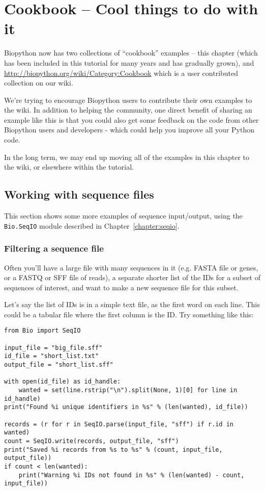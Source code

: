 \chapter{Cookbook -- Cool things to do with it}
\label{chapter:cookbook}

Biopython now has two collections of ``cookbook'' examples -- this chapter
(which has been included in this tutorial for many years and has gradually
grown), and \url{http://biopython.org/wiki/Category:Cookbook} which is a
user contributed collection on our wiki.

We're trying to encourage Biopython users to contribute their own examples
to the wiki. In addition to helping the community, one direct benefit of
sharing an example like this is that you could also get some feedback on
the code from other Biopython users and developers - which could help you
improve all your Python code.

In the long term, we may end up moving all of the examples in this chapter
to the wiki, or elsewhere within the tutorial.

\section{Working with sequence files}
\label{sec:cookbook-sequences}

This section shows some more examples of sequence input/output, using the
\verb|Bio.SeqIO| module described in Chapter~\ref{chapter:seqio}.

\subsection{Filtering a sequence file}

Often you'll have a large file with many sequences in it (e.g. FASTA file
or genes, or a FASTQ or SFF file of reads), a separate shorter list of
the IDs for a subset of sequences of interest, and want to make a new
sequence file for this subset.

Let's say the list of IDs is in a simple text file, as the first word on
each line. This could be a tabular file where the first column is the ID.
Try something like this:

\begin{verbatim}
from Bio import SeqIO

input_file = "big_file.sff"
id_file = "short_list.txt"
output_file = "short_list.sff"

with open(id_file) as id_handle:
    wanted = set(line.rstrip("\n").split(None, 1)[0] for line in id_handle)
print("Found %i unique identifiers in %s" % (len(wanted), id_file))

records = (r for r in SeqIO.parse(input_file, "sff") if r.id in wanted)
count = SeqIO.write(records, output_file, "sff")
print("Saved %i records from %s to %s" % (count, input_file, output_file))
if count < len(wanted):
    print("Warning %i IDs not found in %s" % (len(wanted) - count, input_file))
\end{verbatim}

